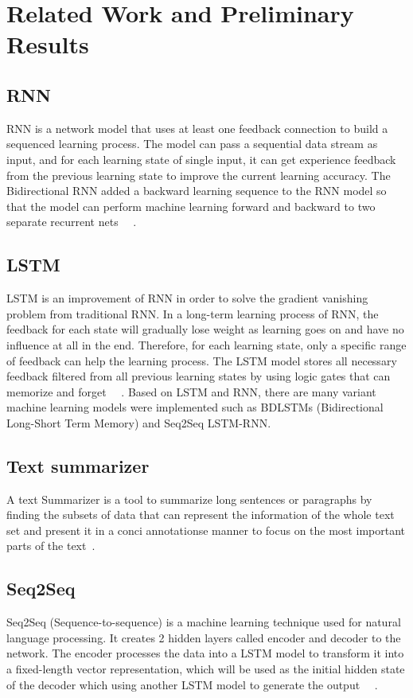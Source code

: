 \documentclass[conference]{IEEEtran}
\begin{document}
\section{Related Work and Preliminary Results}
\subsection{RNN}
RNN is a network model that uses at least one feedback connection to build a sequenced learning process. The model can pass a sequential data stream as input, and for each learning state of single input, it can get experience feedback from the previous learning state to improve the current learning accuracy. The Bidirectional RNN added a backward learning sequence to the RNN model so that the model can perform machine learning forward and backward to two separate recurrent nets ~\cite{vu2016bi}~\cite{schuster1997bidirectional}. 
\subsection{LSTM}
LSTM is an improvement of RNN in order to solve the gradient vanishing problem from traditional RNN. In a long-term learning process of RNN, the feedback for each state will gradually lose weight as learning goes on and have no influence at all in the end. Therefore, for each learning state, only a specific range of feedback can help the learning process. The LSTM model stores all necessary feedback filtered from all previous learning states by using logic gates that can memorize and forget ~\cite{hochreiter1997long}~\cite{gers2000learning}. Based on LSTM and RNN, there are many variant machine learning models were implemented such as BDLSTMs (Bidirectional Long-Short Term Memory) and Seq2Seq LSTM-RNN. 
\subsection{Text summarizer}
A text Summarizer is a tool to summarize long sentences or paragraphs by finding the subsets of data that can represent the information of the whole text set and present it in a conci annotationse manner to focus on the most important parts of the text~\cite{sinha2018extractive}. 
\subsection{Seq2Seq}
Seq2Seq (Sequence-to-sequence) is a machine learning technique used for natural language processing. It creates 2 hidden layers called encoder and decoder to the network. The encoder processes the data into a LSTM model to transform it into a fixed-length vector representation, which will be used as the initial hidden state of the decoder which using another LSTM model to generate the output ~\cite{sutskever2014sequence}~\cite{vinyals2015show}. 
\end{document}
